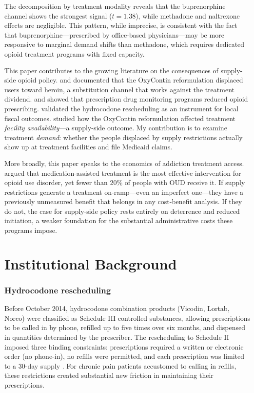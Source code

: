 \documentclass[12pt]{article}
\begin{document}
The decomposition by treatment modality reveals that the buprenorphine channel shows the strongest signal ($t = 1.38$), while methadone and naltrexone effects are negligible. This pattern, while imprecise, is consistent with the fact that buprenorphine---prescribed by office-based physicians---may be more responsive to marginal demand shifts than methadone, which requires dedicated opioid treatment programs with fixed capacity.

This paper contributes to the growing literature on the consequences of supply-side opioid policy. \citet{alpert2018supply} and \citet{evans2019opioid} documented that the OxyContin reformulation displaced users toward heroin, a substitution channel that works against the treatment dividend. \citet{buchmueller2020effect} and \citet{mallatt2022effect} showed that prescription drug monitoring programs reduced opioid prescribing. \citet{lozanorojas2025fiscal} validated the hydrocodone rescheduling as an instrument for local fiscal outcomes. \citet{dinardi2025oxycontin} studied how the OxyContin reformulation affected treatment \textit{facility availability}---a supply-side outcome. My contribution is to examine treatment \textit{demand}: whether the people displaced by supply restrictions actually show up at treatment facilities and file Medicaid claims.

More broadly, this paper speaks to the economics of addiction treatment access. \citet{volkow2018medication} argued that medication-assisted treatment is the most effective intervention for opioid use disorder, yet fewer than 20\% of people with OUD receive it. If supply restrictions generate a treatment on-ramp---even an imperfect one---they have a previously unmeasured benefit that belongs in any cost-benefit analysis. If they do not, the case for supply-side policy rests entirely on deterrence and reduced initiation, a weaker foundation for the substantial administrative costs these programs impose.

\section{Institutional Background}

\subsubsection*{Hydrocodone rescheduling}  Before October 2014, hydrocodone combination products (Vicodin, Lortab, Norco) were classified as Schedule III controlled substances, allowing prescriptions to be called in by phone, refilled up to five times over six months, and dispensed in quantities determined by the prescriber. The rescheduling to Schedule II imposed three binding constraints: prescriptions required a written or electronic order (no phone-in), no refills were permitted, and each prescription was limited to a 30-day supply \citep{jones2014hydrocodone}. For chronic pain patients accustomed to calling in refills, these restrictions created substantial new friction in maintaining their prescriptions.
\end{document}

